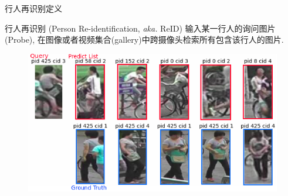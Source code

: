 \documentclass[notes]{beamer}
\begin{document}
\begin{frame}
	{行人再识别定义}
	\begin{block}{行人再识别 (Person Re-identification, \textit{aka.} ReID)}
		输入某一行人的询问图片(Probe), 在图像或者视频集合(gallery)中跨摄像头检索所有包含该行人的图片. 
	\end{block}
	\begin{figure}
		\includegraphics[width=0.9\linewidth]{2018-03-11-22-56-05.png}
	\end{figure}
\end{frame}
\end{document}
